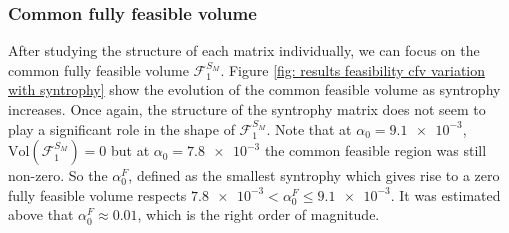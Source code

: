 \documentclass[12pt, titlepage]{report}
\begin{document}
  \subsubsection{Common fully feasible volume}
 After studying the structure of each matrix individually, we can focus on the common fully feasible volume $\mathcal{F}_1^{S_M}$. Figure \ref{fig: results feasibility cfv variation with syntrophy} show the evolution of the common feasible volume as syntrophy increases. Once again, the structure of the syntrophy matrix does not seem to play a significant role in the shape of $\mathcal{F}_1^{S_M}$. Note that at $\alpha_0=\num{9.1e-3}$, $\text{Vol}\left(\mathcal{F}_1^{S_M}\right)=0$ but at $\alpha_0=\num{7.8e-3}$ the common feasible region was still non-zero. So the  $\alpha_0^F$, defined as the smallest syntrophy which gives rise to a zero fully feasible volume respects $\num{7.8e-3} < \alpha_0^F \leq \num{9.1e-3}$. It was estimated above that $\alpha_0^F \approx 0.01$, which is the right order of magnitude.
\end{document}

